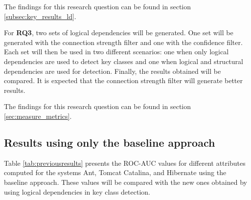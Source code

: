 \noindent{}

\medskip

The findings for this research question can be found in section \ref{subsec:key_results_ld}.

For \textbf{RQ3}, two sets of logical dependencies will be generated. One set will be generated with the connection strength filter and one with the confidence filter. Each set will then be used in two different scenarios: one when only logical dependencies are used to detect key classes and one when logical and structural dependencies are used for detection. Finally, the results obtained will be compared. It is expected that the connection strength filter will generate better results.

\medskip

\noindent{}

\medskip

The findings for this research question can be found in section \ref{sec:measure_metrics}.


\subsection{Results using only the baseline approach}
\label{subsec:key_results_baseline}

\hspace{4em}Table \ref{tab:previousresults} presents the ROC-AUC values for different attributes computed for the systems Ant, Tomcat Catalina, and Hibernate using the baseline approach. These values will be compared with the new ones obtained by using logical dependencies in key class detection.


\begin{table}
\renewcommand{\arraystretch}{1}
\caption{ROC-AUC metric values extracted. }
\label{tab:previousresults}
\centering
{}
\end{table}

